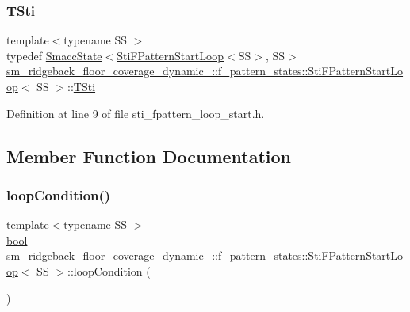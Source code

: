 \subsubsection{\texorpdfstring{T\+Sti}{TSti}}
{\footnotesize\ttfamily template$<$typename SS $>$ \\
typedef \hyperlink{classSmaccState}{Smacc\+State}$<$\hyperlink{structsm__ridgeback__floor__coverage__dynamic__1_1_1f__pattern__states_1_1StiFPatternStartLoop}{Sti\+F\+Pattern\+Start\+Loop}$<$SS$>$, SS$>$ \hyperlink{structsm__ridgeback__floor__coverage__dynamic__1_1_1f__pattern__states_1_1StiFPatternStartLoop}{sm\+\_\+ridgeback\+\_\+floor\+\_\+coverage\+\_\+dynamic\+\_\+::f\+\_\+pattern\+\_\+states\+::\+Sti\+F\+Pattern\+Start\+Loop}$<$ SS $>$\+::\hyperlink{structsm__ridgeback__floor__coverage__dynamic__1_1_1f__pattern__states_1_1StiFPatternStartLoop_a6e8112bd4cff26ef9b16daf8667d0a51}{T\+Sti}}



Definition at line 9 of file sti\+\_\+fpattern\+\_\+loop\+\_\+start.\+h.



\subsection{Member Function Documentation}
\mbox{\label{structsm__ridgeback__floor__coverage__dynamic__1_1_1f__pattern__states_1_1StiFPatternStartLoop_a47c1d55fa4fc153703903a92353e32ac}} 
\subsubsection{\texorpdfstring{loop\+Condition()}{loopCondition()}}
{\footnotesize\ttfamily template$<$typename SS $>$ \\
\hyperlink{classbool}{bool} \hyperlink{structsm__ridgeback__floor__coverage__dynamic__1_1_1f__pattern__states_1_1StiFPatternStartLoop}{sm\+\_\+ridgeback\+\_\+floor\+\_\+coverage\+\_\+dynamic\+\_\+::f\+\_\+pattern\+\_\+states\+::\+Sti\+F\+Pattern\+Start\+Loop}$<$ SS $>$\+::loop\+Condition (\begin{DoxyParamCaption}{ }\end{DoxyParamCaption})\hspace{0.3cm}{\ttfamily [inline]}}




